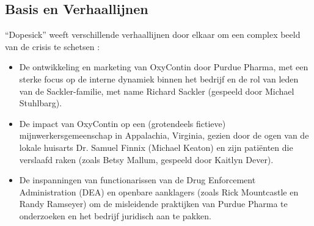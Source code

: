 \documentclass[11pt, a4paper]{report} %
\begin{document}
\subsection{Basis en Verhaallijnen}
\enquote{Dopesick} weeft verschillende verhaallijnen door elkaar om een complex beeld van de crisis te schetsen \parencite{WikipediaDopesickMiniseries}:
\begin{itemize}
    \item De ontwikkeling en marketing van OxyContin door Purdue Pharma, met een sterke focus op de interne dynamiek binnen het bedrijf en de rol van leden van de Sackler-familie, met name Richard Sackler (gespeeld door Michael Stuhlbarg).
    \item De impact van OxyContin op een (grotendeels fictieve) mijnwerkersgemeenschap in Appalachia, Virginia, gezien door de ogen van de lokale huisarts Dr. Samuel Finnix (Michael Keaton) en zijn patiënten die verslaafd raken (zoals Betsy Mallum, gespeeld door Kaitlyn Dever).
    \item De inspanningen van functionarissen van de Drug Enforcement Administration (DEA) en openbare aanklagers (zoals Rick Mountcastle en Randy Ramseyer) om de misleidende praktijken van Purdue Pharma te onderzoeken en het bedrijf juridisch aan te pakken.
\end{itemize}
\end{document}
